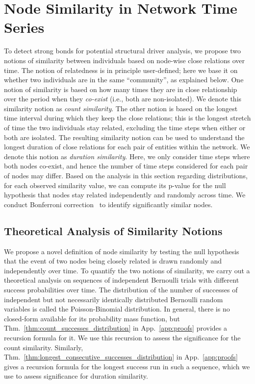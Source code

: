 \documentclass{article}
\theoremstyle{plain}
\theoremstyle{definition}
\theoremstyle{remark}
\begin{document}
\section{Node Similarity in Network Time Series} 
To detect strong bonds for potential structural driver analysis, we propose two notions of similarity between individuals based on node-wise close relations over time. The notion of relatedness is in principle user-defined; here we base it on whether two individuals are in the same ``community'', as explained below. One notion of similarity is based on how many times they are in close relationship over the period when they \emph{co-exist} (i.e., both are non-isolated). We denote this similarity notion as \emph{count similarity}. The other notion is based on the longest time interval during which they keep the close relations; this is the longest stretch of time the two individuals stay related, excluding the time steps when either or both are isolated. The resulting similarity notion can be used to understand the longest duration of close relations for each pair of entities within the network. We denote this notion as \emph{duration similarity}. Here, we only consider time steps where both nodes co-exist, and hence the number of time steps considered for each pair of nodes may differ. Based on the analysis in this section regarding distributions, for each observed similarity value, we can compute its p-value for the null hypothesis that nodes stay related independently and randomly across time. We conduct Bonferroni correction~\cite{vanderweele2019some} to identify significantly similar nodes.


\subsection{Theoretical Analysis of Similarity Notions}
\label{subsec:similarity_theorems}
We propose a novel definition of node similarity by testing the null hypothesis that the event of two nodes being closely related is drawn randomly and independently over time. To quantify the two notions of similarity, we carry out a theoretical analysis on sequences of independent Bernoulli trials with different success probabilities over time. The distribution of the number of successes of independent but not necessarily identically distributed Bernoulli random variables is called the Poisson-Binomial distribution. In general, there is no closed-form available for its probability mass function, but Thm.~\ref{thm:count_successes_distribution} in App.~\ref{app:proofs} provides a recursion formula for it. We use this recursion to assess the significance for the count similarity. Similarly, Thm.~\ref{thm:longest_consecutive_successes_distribution} in App.~\ref{app:proofs} gives a recursion formula for the longest success run in such a sequence, which we use to assess significance for duration similarity. 
\end{document}
